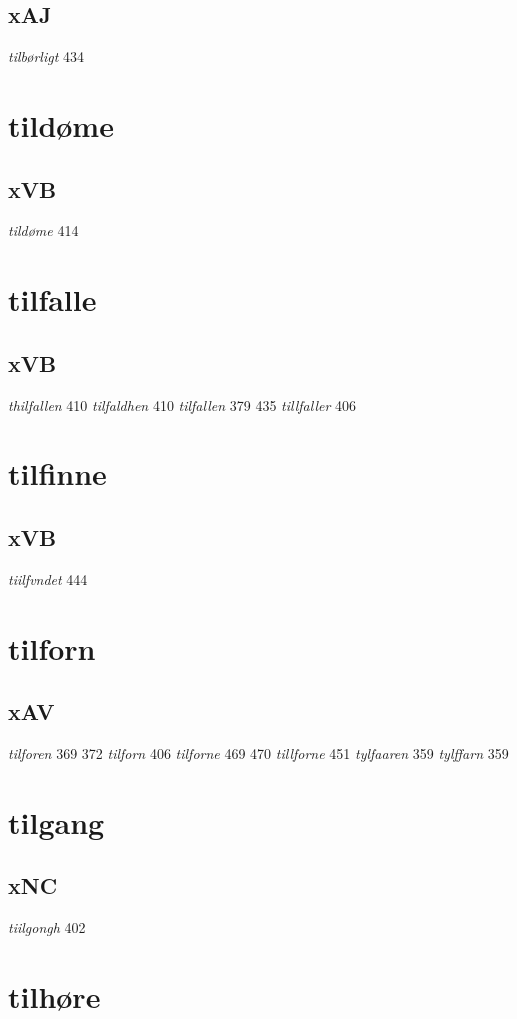 \documentclass[a4paper,twocolumn]{article}
\begin{document}
\subsection{xAJ}
\label{sec:orga3a3087}
\emph{tilbørligt} 434 
\section{tildøme}
\label{sec:org538d08b}
\subsection{xVB}
\label{sec:org41dd2b2}
\emph{tildøme} 414 
\section{tilfalle}
\label{sec:orgdc7f51b}
\subsection{xVB}
\label{sec:org370b406}
\emph{thilfallen} 410 \emph{tilfaldhen} 410 \emph{tilfallen} 379 435 \emph{tillfaller} 406 
\section{tilfinne}
\label{sec:org940a2fe}
\subsection{xVB}
\label{sec:orgb8be5cf}
\emph{tiilfvndet} 444 
\section{tilforn}
\label{sec:org3d8ebdc}
\subsection{xAV}
\label{sec:orgfa97511}
\emph{tilforen} 369 372 \emph{tilforn} 406 \emph{tilforne} 469 470 \emph{tillforne} 451 \emph{tylfaaren} 359 \emph{tylffarn} 359 
\section{tilgang}
\label{sec:orge2e7f92}
\subsection{xNC}
\label{sec:org1b99fd1}
\emph{tiilgongh} 402 
\section{tilhøre}
\label{sec:org824fcde}
\end{document}
